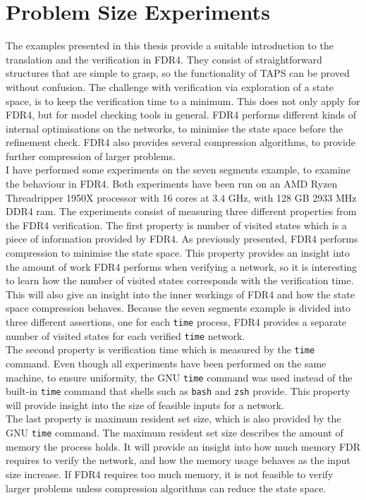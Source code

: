 \section{Problem Size Experiments}
The examples presented in this thesis provide a suitable introduction to the translation and the verification in FDR4. They consist of straightforward structures that are simple to grasp, so the functionality of TAPS can be proved without confusion.
The challenge with verification via exploration of a state space, is to keep the verification time to a minimum. This does not only apply for FDR4, but for model checking tools in general. FDR4 performs different kinds of internal optimisations on the networks, to minimise the state space before the refinement check. FDR4 also provides several compression algorithms, to provide further compression of larger problems. \\

I have performed some experiments on the seven segments example, to examine the behaviour in FDR4.
Both experiments have been run on an
AMD Ryzen Threadripper 1950X processor with 16 cores at 3.4 GHz, with 128 GB 2933 MHz DDR4 ram.
The experiments consist of measuring three different properties from the FDR4 verification.
The first property is number of visited states which is a piece of information provided by FDR4.
As previously presented, FDR4 performs compression to minimise the state space.
This property provides an insight into the amount of work FDR4 performs when verifying a network, so it is interesting to learn how the number of visited states corresponds with the verification time. This will also give an insight into the inner workings of FDR4 and how the state space compression behaves.
Because the seven segments example is divided into three different assertions, one for each \texttt{time} process, FDR4 provides a separate number of visited states for each verified \texttt{time} network. \\

The second property is verification time which is measured by the \texttt{time} command. Even though all experiments have been performed on the same machine, to ensure uniformity, the GNU \texttt{time} command was used instead of the built-in \texttt{time} command that shells such as \texttt{bash} and \texttt{zsh} provide. This property will provide insight into the size of feasible inputs for a \cspm{} network.\\

The last property is maximum resident set size, which is also provided by the GNU \texttt{time} command. The maximum resident set size describes the amount of memory the process holds. It will provide an insight into how much memory FDR requires to verify the network, and how the memory usage behaves as the input size increase. If FDR4 requires too much memory, it is not feasible to verify larger problems unless compression algorithms can reduce the state space. \\

